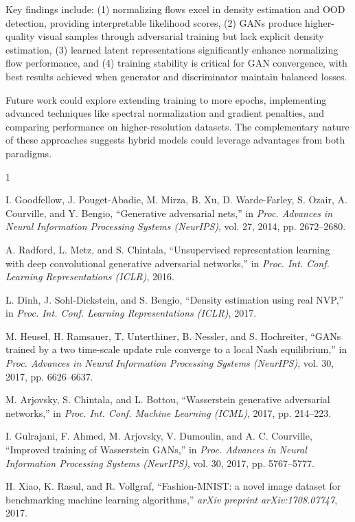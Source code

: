 \documentclass[conference,12pt]{IEEEtran}
\begin{document}
Key findings include: (1) normalizing flows excel in density estimation and OOD detection, providing interpretable likelihood scores, (2) GANs produce higher-quality visual samples through adversarial training but lack explicit density estimation, (3) learned latent representations significantly enhance normalizing flow performance, and (4) training stability is critical for GAN convergence, with best results achieved when generator and discriminator maintain balanced losses.

Future work could explore extending training to more epochs, implementing advanced techniques like spectral normalization and gradient penalties, and comparing performance on higher-resolution datasets. The complementary nature of these approaches suggests hybrid models could leverage advantages from both paradigms.

\begin{thebibliography}{1}

I. Goodfellow, J. Pouget-Abadie, M. Mirza, B. Xu, D. Warde-Farley, S. Ozair, A. Courville, and Y. Bengio, ``Generative adversarial nets,'' in \textit{Proc. Advances in Neural Information Processing Systems (NeurIPS)}, vol. 27, 2014, pp. 2672--2680.

A. Radford, L. Metz, and S. Chintala, ``Unsupervised representation learning with deep convolutional generative adversarial networks,'' in \textit{Proc. Int. Conf. Learning Representations (ICLR)}, 2016.

L. Dinh, J. Sohl-Dickstein, and S. Bengio, ``Density estimation using real NVP,'' in \textit{Proc. Int. Conf. Learning Representations (ICLR)}, 2017.

M. Heusel, H. Ramsauer, T. Unterthiner, B. Nessler, and S. Hochreiter, ``GANs trained by a two time-scale update rule converge to a local Nash equilibrium,'' in \textit{Proc. Advances in Neural Information Processing Systems (NeurIPS)}, vol. 30, 2017, pp. 6626--6637.

M. Arjovsky, S. Chintala, and L. Bottou, ``Wasserstein generative adversarial networks,'' in \textit{Proc. Int. Conf. Machine Learning (ICML)}, 2017, pp. 214--223.

I. Gulrajani, F. Ahmed, M. Arjovsky, V. Dumoulin, and A. C. Courville, ``Improved training of Wasserstein GANs,'' in \textit{Proc. Advances in Neural Information Processing Systems (NeurIPS)}, vol. 30, 2017, pp. 5767--5777.

H. Xiao, K. Rasul, and R. Vollgraf, ``Fashion-MNIST: a novel image dataset for benchmarking machine learning algorithms,'' \textit{arXiv preprint arXiv:1708.07747}, 2017.

\end{thebibliography}
\end{document}
